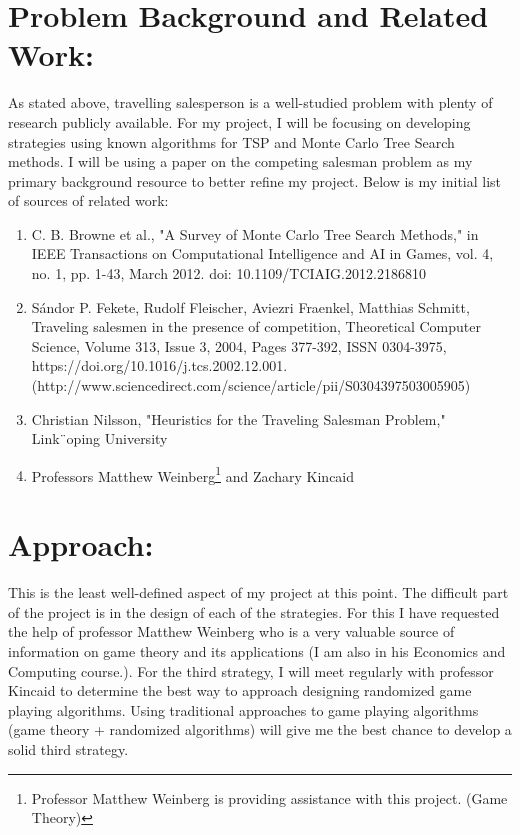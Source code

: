 \documentclass[12pt]{article}%
\begin{document}
	\section*{Problem Background and Related Work:}
	
	As stated above, travelling salesperson is a well-studied problem with plenty of research publicly available. For my project, I will be focusing on developing strategies using known algorithms for TSP and Monte Carlo Tree Search methods. I will be using a paper on the competing salesman problem as my primary background resource to better refine my project. Below is my initial list of sources of related work:
	
	\begin{enumerate}
		\item C. B. Browne et al., "A Survey of Monte Carlo Tree Search Methods," in IEEE Transactions on Computational Intelligence and AI in Games, vol. 4, no. 1, pp. 1-43, March 2012.
		doi: 10.1109/TCIAIG.2012.2186810
		\item Sándor P. Fekete, Rudolf Fleischer, Aviezri Fraenkel, Matthias Schmitt,
		Traveling salesmen in the presence of competition,
		Theoretical Computer Science,
		Volume 313, Issue 3,
		2004,
		Pages 377-392,
		ISSN 0304-3975,
		https://doi.org/10.1016/j.tcs.2002.12.001.
		(http://www.sciencedirect.com/science/article/pii/S0304397503005905)
		\item Christian Nilsson, "Heuristics for the Traveling Salesman Problem," Link¨oping University
		\item Professors Matthew Weinberg\footnote{Professor Matthew Weinberg is providing assistance with this project. (Game Theory)} and Zachary Kincaid
	\end{enumerate}
	
	\section*{Approach:}
	
	This is the least well-defined aspect of my project at this point. The difficult part of the project is in the design of each of the strategies. For this I have requested the help of professor Matthew Weinberg who is a very valuable source of information on game theory and its applications (I am also in his Economics and Computing course.). For the third strategy, I will meet regularly with professor Kincaid to determine the best way to approach designing randomized game playing algorithms. Using traditional approaches to game playing algorithms (game theory + randomized algorithms) will give me the best chance to develop a solid third strategy.
	
\end{document}
